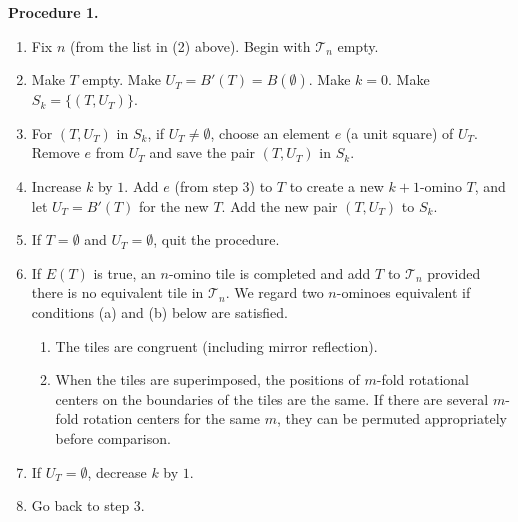\documentclass{ws-ijcga}
\begin{document}
\vspace{1em}
\noindent
{\bf Procedure 1.}
\begin{enumerate}
\item
Fix $n$ (from the list in (2) above). Begin with $\mathscr{T}_n$ empty.
\item
Make $T$ empty. Make $U_T = B'(T) = B(\emptyset)$. Make $k = 0$. Make $S_k = \{(T, U_T)\}$.
\item
For $(T, U_T)$ in $S_k$, if $U_T \ne \emptyset$, 
choose an element $e$ (a unit square) of $U_T$. Remove $e$ from $U_T$
and save the pair $(T, U_T)$ in $S_k$.
\item
Increase $k$ by $1$. Add $e$ (from step 3) to $T$ to create a new $k+1$-omino $T$, 
and let $U_T = B'(T)$ for the new $T$. Add the new pair $(T, U_T)$ to $S_k$.
\item
If $T = \emptyset$ and $U_T = \emptyset$, quit the procedure.
\item
If $E(T)$ is true, an $n$-omino tile is completed and add $T$ to $\mathscr{T}_n$ provided there is no equivalent
tile in $\mathscr{T}_n$. We regard two $n$-ominoes equivalent if conditions (a) and (b) below are satisfied.
\begin{enumerate}
\item
The tiles are congruent (including mirror reflection).
\label{proc1a}
\item
When the tiles are superimposed, the positions of $m$-fold rotational centers on the
boundaries of the tiles are the same. 
If there are several $m$-fold rotation centers for the same $m$, 
they can be permuted appropriately before comparison.
\label{proc1b}
\end{enumerate}
\item
If $U_T = \emptyset$, decrease $k$ by $1$.
\item
Go back to step 3.
\end{enumerate}
\end{document}
